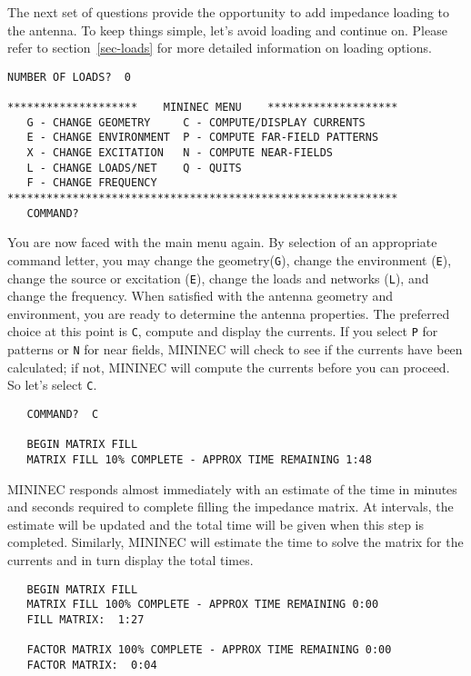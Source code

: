 \documentclass[12pt]{article}
\begin{document}
The next set of questions provide the opportunity to add impedance
loading to the antenna. To keep things simple, let's avoid loading and
continue on. Please refer to section~\ref{sec-loads} for more detailed
information on loading options.

\begin{Verbatim}
NUMBER OF LOADS?  0

********************    MININEC MENU    ********************
   G - CHANGE GEOMETRY     C - COMPUTE/DISPLAY CURRENTS
   E - CHANGE ENVIRONMENT  P - COMPUTE FAR-FIELD PATTERNS
   X - CHANGE EXCITATION   N - COMPUTE NEAR-FIELDS
   L - CHANGE LOADS/NET    Q - QUITS
   F - CHANGE FREQUENCY
************************************************************
   COMMAND?
\end{Verbatim}

You are now faced with the main menu again. By selection of an
appropriate command letter, you may change the geometry(\verb+G+),
change the environment (\verb+E+), change the source or excitation
(\verb+E+), change the loads and networks (\verb+L+), and change the
frequency. When satisfied with the antenna geometry and environment, you
are ready to determine the antenna properties. The preferred choice at
this point is \verb+C+, compute and display the currents. If you select
\verb+P+ for patterns or \verb+N+ for near fields, MININEC will check to
see if the currents have been calculated; if not, MININEC will compute
the currents before you can proceed. So let's select \verb+C+.

\begin{Verbatim}
   COMMAND?  C

   BEGIN MATRIX FILL
   MATRIX FILL 10% COMPLETE - APPROX TIME REMAINING 1:48
\end{Verbatim}

MININEC responds almost immediately with an estimate of the time in
minutes and seconds required to complete filling the impedance matrix.
At intervals, the estimate will be updated and the total time will be
given when this step is completed. Similarly, MININEC will estimate the
time to solve the matrix for the currents and in turn display the total
times.

\begin{Verbatim}
   BEGIN MATRIX FILL
   MATRIX FILL 100% COMPLETE - APPROX TIME REMAINING 0:00
   FILL MATRIX:  1:27

   FACTOR MATRIX 100% COMPLETE - APPROX TIME REMAINING 0:00
   FACTOR MATRIX:  0:04
\end{Verbatim}
\end{document}
